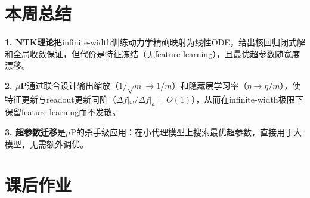 \documentclass[11pt,a4paper]{article}
\begin{document}
\section{本周总结}

\begin{tcolorbox}[colback=yellow!10,colframe=yellow!60!black,title=\textbf{三句话总结}]
\textbf{1. NTK理论}把infinite-width训练动力学精确映射为线性ODE，给出核回归闭式解和全局收敛保证，但代价是特征冻结（无feature learning），且最优超参数随宽度漂移。

\textbf{2. $\mu$P}通过联合设计输出缩放（$1/\sqrt{m}\to 1/m$）和隐藏层学习率（$\eta\to\eta/m$），使特征更新与readout更新同阶（$\Delta f|_w/\Delta f|_a = O(1)$），从而在infinite-width极限下保留feature learning而不发散。

\textbf{3. 超参数迁移}是$\mu$P的杀手级应用：在小代理模型上搜索最优超参数，直接用于大模型，无需额外调优。
\end{tcolorbox}

\section*{课后作业}
\end{document}
